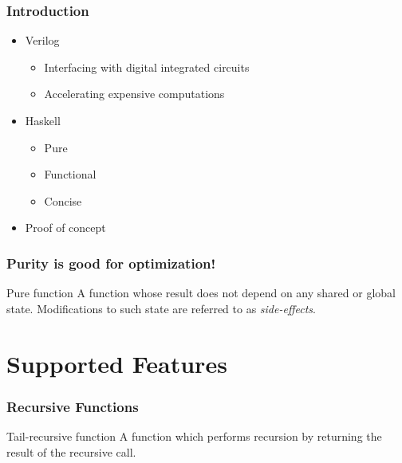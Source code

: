 \documentclass{beamer}
\begin{document}
\begin{frame}[t]
    \frametitle{Introduction}
    \begin{itemize}
        \item Verilog
            \begin{itemize}
                \item Interfacing with digital integrated circuits
                \item Accelerating expensive computations
            \end{itemize}
        \item Haskell
            \begin{itemize}
                \item Pure
                \item Functional
                \item Concise
            \end{itemize}
        \item Proof of concept
    \end{itemize}
\end{frame}


\begin{frame}[fragile]
    \frametitle{Purity is good for optimization!}
    \begin{block}{Pure function}
        A function whose result does not depend on any shared or global state. Modifications to such state are referred to as
        \textit{side-effects}.
    \end{block}

    
    
\end{frame}

\section{Supported Features}

\begin{frame}
    \frametitle{Recursive Functions}
    \begin{block}{Tail-recursive function}
        A function which performs recursion by returning the result of the recursive call.
    \end{block}

    

\end{frame}
\end{document}
